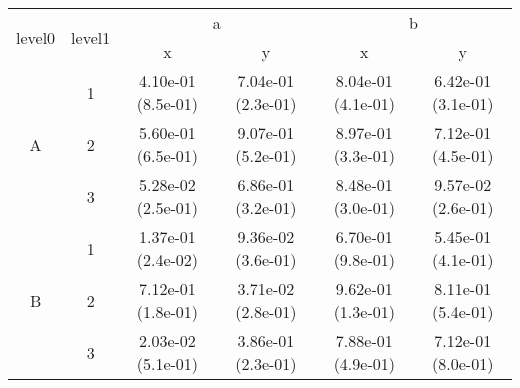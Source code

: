 \begin{tabular}{cccccc}
\toprule
\multirow{2}{*}{level0} & \multirow{2}{*}{level1}&\multicolumn{2}{c}{a}&\multicolumn{2}{c}{b}\tabularnewline
\cmidrule(lr){3-4}
\cmidrule(lr){5-6}
&&x&y&x&y\tabularnewline
\midrule
\multirow{3}{*}{A}&1& 4.10e-01 (8.5e-01)& 7.04e-01 (2.3e-01)& 8.04e-01 (4.1e-01)& 6.42e-01 (3.1e-01)\tabularnewline
&2& 5.60e-01 (6.5e-01)& 9.07e-01 (5.2e-01)& 8.97e-01 (3.3e-01)& 7.12e-01 (4.5e-01)\tabularnewline
&3& 5.28e-02 (2.5e-01)& 6.86e-01 (3.2e-01)& 8.48e-01 (3.0e-01)& 9.57e-02 (2.6e-01)\tabularnewline
\midrule
\multirow{3}{*}{B}&1& 1.37e-01 (2.4e-02)& 9.36e-02 (3.6e-01)& 6.70e-01 (9.8e-01)& 5.45e-01 (4.1e-01)\tabularnewline
&2& 7.12e-01 (1.8e-01)& 3.71e-02 (2.8e-01)& 9.62e-01 (1.3e-01)& 8.11e-01 (5.4e-01)\tabularnewline
&3& 2.03e-02 (5.1e-01)& 3.86e-01 (2.3e-01)& 7.88e-01 (4.9e-01)& 7.12e-01 (8.0e-01)\tabularnewline
\bottomrule
\end{tabular}
